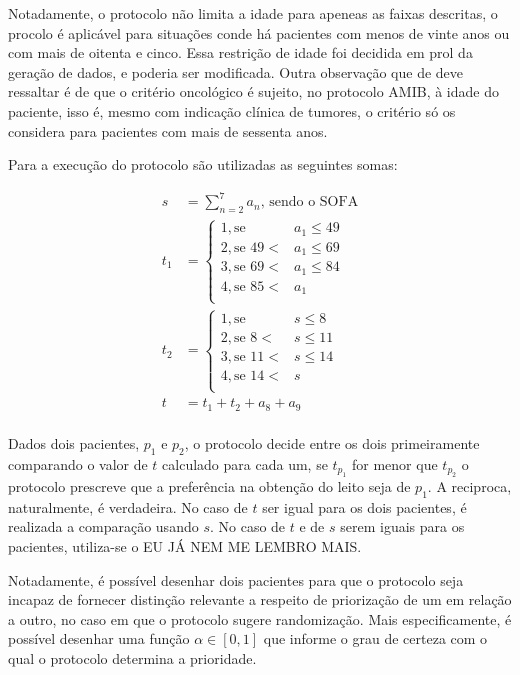 \documentclass[12pt]{article}
\begin{document}
Notadamente, o protocolo não limita a idade para apeneas as faixas descritas, o procolo é aplicável para situações conde há pacientes com menos de vinte anos ou com mais de oitenta e cinco.
Essa restrição de idade foi decidida em prol da geração de dados, e poderia ser modificada.
Outra observação que de deve ressaltar é de que o critério oncológico é sujeito, no protocolo AMIB, à idade do paciente, isso é, mesmo com indicação clínica de tumores, o critério só os considera para pacientes com mais de sessenta anos.

Para a execução do protocolo são utilizadas as seguintes somas:

\[
\begin{split}
    s &= \sum_{n=2}^{7} a_n\text{, sendo o SOFA} \\
    t_1 &=  \begin{cases}
        1, \text{se } & a_1 \le 49 \\
        2, \text{se } 49 < & a_1 \le 69 \\
        3, \text{se } 69 < & a_1 \le 84 \\
        4, \text{se } 85 < & a_1 \\
    \end{cases} \\
    t_2 &= \begin{cases}
        1, \text{se } & s \le 8 \\
        2, \text{se } 8 < & s \le 11 \\
        3, \text{se } 11 < & s \le  14 \\
        4, \text{se } 14 < & s \\
    \end{cases} \\
    t &= t_1 + t_2 + a_8 + a_9 \\ %
\end{split}
\] 

Dados dois pacientes, $p_1$ e $p_2$, o protocolo decide entre os dois primeiramente comparando o valor de $t$ calculado para cada um, se  $t_{p_1}$ for menor que $t_{p_2}$ o protocolo prescreve que a preferência na obtenção do leito seja de  $p_1.$
A reciproca, naturalmente, é verdadeira.
No caso de $t$ ser igual para os dois pacientes, é realizada a comparação usando  $s$. 
No caso de $t$ e de  $s$ serem iguais para os pacientes, utiliza-se o EU JÁ NEM ME LEMBRO MAIS.

Notadamente, é possível desenhar dois pacientes para que o protocolo seja incapaz de fornecer distinção relevante a respeito de priorização de um em relação a outro, no caso em que o protocolo sugere randomização.
Mais especificamente, é possível desenhar uma função $\alpha \in [0, 1]$ que informe o grau de certeza com o qual o protocolo determina a prioridade.
\end{document}
